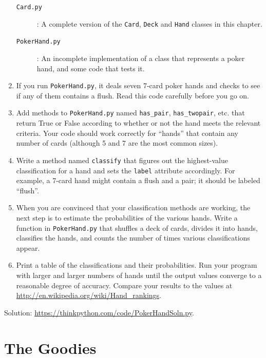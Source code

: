 \documentclass[10pt]{book}
\begin{document}
\begin{exercise}
\begin{enumerate}
\begin{description}
\item[{\tt Card.py}]: A complete version of the {\tt Card},
{\tt Deck} and {\tt Hand} classes in this chapter.

\item[{\tt PokerHand.py}]: An incomplete implementation of a class
that represents a poker hand, and some code that tests it.

\end{description}
%
\item If you run {\tt PokerHand.py}, it deals seven 7-card poker hands
and checks to see if any of them contains a flush.  Read this
code carefully before you go on.

\item Add methods to {\tt PokerHand.py} named \verb"has_pair",
\verb"has_twopair", etc. that return True or False according to
whether or not the hand meets the relevant criteria.  Your code should
work correctly for ``hands'' that contain any number of cards
(although 5 and 7 are the most common sizes).

\item Write a method named {\tt classify} that figures out
the highest-value classification for a hand and sets the
{\tt label} attribute accordingly.  For example, a 7-card hand
might contain a flush and a pair; it should be labeled ``flush''.

\item When you are convinced that your classification methods are
working, the next step is to estimate the probabilities of the various
hands.  Write a function in {\tt PokerHand.py} that shuffles a deck of
cards, divides it into hands, classifies the hands, and counts the
number of times various classifications appear.

\item Print a table of the classifications and their probabilities.
Run your program with larger and larger numbers of hands until the
output values converge to a reasonable degree of accuracy.  Compare
your results to the values at \url{http://en.wikipedia.org/wiki/Hand_rankings}.

\end{enumerate}

Solution: \url{https://thinkpython.com/code/PokerHandSoln.py}.
\end{exercise}


\chapter{The Goodies}
\end{document}
